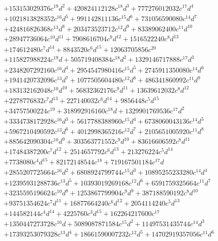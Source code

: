 {\begin{align*}
&+153153029376c^{19}d^{2}+420824112128c^{18}d^{3}+777276012032c^{17}d^{4}\\
&+1021813828352c^{16}d^{5}+991142811136c^{15}d^{6}+731056590080c^{14}d^{7}\\
&+424816826368c^{13}d^{8}+203473523712c^{12}d^{9}+83389062400c^{11}d^{10}\\
&+28947736064c^{10}d^{11}+7908616704c^{9}d^{12}+1516522240c^{8}d^{13}\\
&+174612480c^{7}d^{14}+8843520c^{6}d^{15}+12063705856c^{20}\\
&+115827988224c^{19}d+505719408384c^{18}d^{2}+1329146717888c^{17}d^{3}\\
&+2348207292160c^{16}d^{4}+2954547980416c^{15}d^{5}+2745911350080c^{14}d^{6}\\
&+1941420732096c^{13}d^{7}+1077505604480c^{12}d^{8}+486341860992c^{11}d^{9}\\
&+183132162048c^{10}d^{10}+56832362176c^{9}d^{11}+13639612032c^{8}d^{12}\\
&+2278776832c^{7}d^{13}+227140032c^{6}d^{14}+9856448c^{5}d^{15}\\
&+34757500224c^{19}+318992916160c^{18}d+1329901769536c^{17}d^{2}\\
&+3334738172928c^{16}d^{3}+5617788388960c^{15}d^{4}+6738060043136c^{14}d^{5}\\
&+5967210490592c^{13}d^{6}+4012998365216c^{12}d^{7}+2105651005920c^{11}d^{8}\\
&+885642090304c^{10}d^{9}+303563771552c^{9}d^{10}+83616606592c^{8}d^{11}\\
&+17484387200c^{7}d^{12}+2514657792c^{6}d^{13}+213276224c^{5}d^{14}\\
&+7738080c^{4}d^{15}+82172148544c^{18}+719167501184c^{17}d\\
&+2855207725664c^{16}d^{2}+6808924799744c^{15}d^{3}+10895255233280c^{14}d^{4}\\
&+12395931288736c^{13}d^{5}+10393019269168c^{12}d^{6}+6591759325664c^{11}d^{7}\\
&+3235595196624c^{10}d^{8}+1253867799904c^{9}d^{9}+387188590192c^{8}d^{10}\\
&+93751354624c^{7}d^{11}+16877664240c^{6}d^{12}+2054114240c^{5}d^{13}\\
&+144582144c^{4}d^{14}+4225760c^{3}d^{15}+162264217600c^{17}\\
&+1350447273728c^{16}d+5089087871584c^{15}d^{2}+11497531435744c^{14}d^{3}\\
&+17393253079328c^{13}d^{4}+18661590007232c^{12}d^{5}+14702919357056c^{11}d^{6}\\

\end{align*}}
